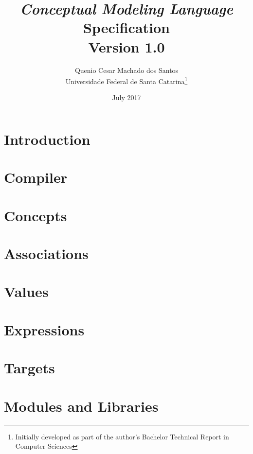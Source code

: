 \documentclass[a4paper,oneside,14pt, extrafontsizes]{memoir}
\title{\emph{Conceptual Modeling Language}\\Specification\\ \small{Version 1.0}}
\author{Quenio Cesar Machado dos Santos\\
\small{Universidade Federal de Santa Catarina}\thanks{
Initially developed as part of the author's Bachelor Technical Report in Computer Sciences}}
\date{July 2017}
\begin{document}
\begin{titlingpage}
\maketitle
\end{titlingpage}

\frontmatter

\begin{KeepFromToc}

\clearpage
\tableofcontents

\clearpage
\listoffigures

\clearpage
\listoftables 

\end{KeepFromToc}

\mainmatter

\chapter{Introduction}


\chapter{Compiler}
\label{ch:compiler}


\chapter{Concepts}


\chapter{Associations}


\chapter{Values}


\chapter{Expressions}

\chapter{Targets}
\label{ch:targets}

\chapter{Modules and Libraries}
\end{document}
